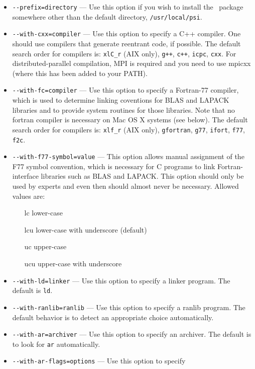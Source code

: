 \documentclass[12pt]{article}
\begin{document}
\begin{itemize}
\item {\tt -}{\tt -prefix=directory} --- Use this option if you wish to
  install the \PSIfour\ package somewhere other than the default
  directory, {\tt /usr/local/psi}. 
\item {\tt -}{\tt -with-cxx=compiler} --- Use this option to specify a
  C++ compiler.  One should use compilers that generate reentrant
  code, if possible. The default search order for compilers is: {\tt xlC\_r}
  (AIX only), {\tt g++}, {\tt c++}, {\tt icpc}, {\tt cxx}.
  For distributed-parallel compilation, MPI is required and you need to use
  mpicxx (where this has been added to your PATH).
\item {\tt -}{\tt -with-fc=compiler} --- Use this option to specify a
  Fortran-77 compiler, which is used to determine linking coventions
  for BLAS and LAPACK libraries and to provide system routines for
  those libraries.  Note that no fortran compiler is necessary on Mac
  OS X systems (see below).  The default search order for compilers
  is: {\tt xlf\_r} (AIX only), {\tt gfortran}, {\tt g77}, {\tt ifort},
  {\tt f77}, {\tt f2c}.
\item {\tt -}{\tt -with-f77-symbol=value} --- This option allows manual
  assignment of the F77 symbol convention, which is necessary for C
  programs to link Fortran-interface libraries such as BLAS and
  LAPACK. This option should only be used by experts and even then
  should almost never be necessary.  Allowed values are:
\begin{itemize}                            
\item[lc] lower-case
\item[lcu]lower-case with underscore (default)
\item[uc] upper-case
\item[ucu] upper-case with underscore
\end{itemize}
\item {\tt -}{\tt -with-ld=linker} --- Use this option to specify
  a linker program. The default is {\tt ld}.
\item {\tt -}{\tt -with-ranlib=ranlib} --- Use this option to specify
  a ranlib program. The default behavior is to detect an appropriate
  choice automatically.
\item {\tt -}{\tt -with-ar=archiver} --- Use this option to specify an
  archiver.  The default is to look for {\tt ar} automatically.
\item {\tt -}{\tt -with-ar-flags=options} --- Use this option to specify

\end{itemize}
\end{document}
